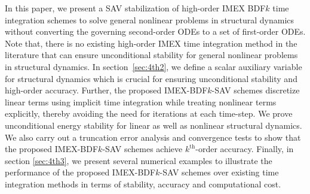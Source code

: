 \documentclass[review]{elsarticle}
\begin{document}
In this paper, we present a SAV stabilization of high-order IMEX BDF$k$ time integration schemes to solve general nonlinear problems in structural dynamics without converting the governing second-order ODEs to a set of first-order ODEs.
Note that, there is no existing high-order IMEX time integration method in the literature that can ensure unconditional stability for general nonlinear problems in structural dynamics. 
In section~\ref{sec:4th2}, we define a scalar auxiliary variable for structural dynamics which is crucial for ensuring unconditional stability and high-order accuracy.
Further, the proposed IMEX-BDF$k$-SAV schemes discretize linear terms using implicit time integration while treating nonlinear terms explicitly, thereby avoiding the need for iterations at each time-step.
We prove unconditional energy stability for linear as well as nonlinear structural dynamics.
We also carry out a truncation error analysis and convergence tests to show that the proposed IMEX-BDF$k$-SAV schemes achieve $k^{\textrm{th}}$-order accuracy.
Finally, in section {\ref{sec:4th3}}, we present several numerical examples
to illustrate the performance of the proposed IMEX-BDF$k$-SAV schemes over existing time integration methods in terms of stability, accuracy and computational cost.
\end{document}
